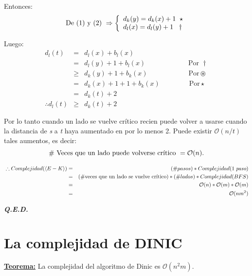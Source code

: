 \documentclass[12pt,a4paper]{report}
\newcommand{\QED}{\hfill \textit{\textbf{Q.E.D.}}}
\begin{document}
  			\par Entonces:
  			\begin{equation*}
  				\textup{De (1) y (2) } \Rightarrow
  	  		\left \lbrace
  	  		\begin{array}{l}
  					d_{k}(y) = d_{k}(x) + 1 \; \; \star \\
  	    		d_{l}(x) = d_{l}(y) + 1 \; \; \; \dag
  	  		\end{array}
  	  		\right.
  			\end{equation*}

  			\par Luego:
  			\begin{eqnarray}
  				\nonumber d_{l}(t) &=& d_{l}(x) + b_{l}(x) \\
  				\nonumber &=& d_{l}(y) + 1 + b_{l}(x) \qquad\qquad\qquad\;\text{Por } \dag \\
  				\nonumber & \geq & d_{k}(y) + 1 + b_{k}(x) \qquad\qquad\qquad\text{Por} \circledast \\
  				\nonumber &=& d_{k}(x) + 1 + 1 + b_{k}(x) \;\qquad\qquad\text{Por} \star \\
  				\nonumber &=& d_{k}(\textit{t}) + 2 \\
  				\nonumber \therefore d_{l}(\textit{t}) & \geq & d_{k}(\textit{t}) + 2
  			\end{eqnarray}

  			\vspace{5mm}
  			\par Por lo tanto cuando un lado se vuelve crítico recien puede volver a usarse cuando la distancia de \textit{s} a \textit{t} haya aumentado en por lo menos 2. Puede existir $\mathcal{O}(n/t)$ tales aumentos, es decir:
  				\[ \# \textup{ Veces que un lado puede volverse crítico } = \mathcal{O}(n). \]

  			\begin{eqnarray}
  				\nonumber \; \therefore Complejidad(\langle E-K\rangle) &=& (\# pasos) * Complejidad(1 \; \textit{paso}) \\
  				\nonumber &=& (\# \textup{veces que un lado se vuelve crítico}) * (\# lados) * Complejidad(BFS) \\
  				\nonumber  &=& \mathcal{O}(n) * \mathcal{O}(m)* \mathcal{O}(m) \\
  				\nonumber &=& \mathcal{O}(nm^{2})
  			\end{eqnarray}

  		\QED

  	\pagebreak
  	\section{La complejidad de DINIC}
  		\textbf{\underline{Teorema:}} La complejidad del algoritmo de Dinic es $\mathcal{O}(n^{2}m)$.
\end{document}
